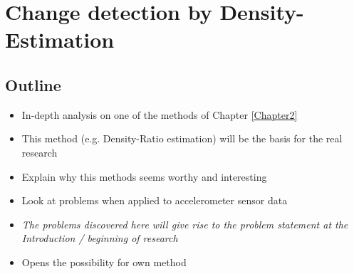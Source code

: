 
\chapter{Change detection by Density-Estimation}

\label{Chapter3} %


\section{Outline}
\begin{itemize}
  \item In-depth analysis on one of the methods of Chapter \ref{Chapter2}
  \item This method (e.g. Density-Ratio estimation) will be the basis for the real research
  \item Explain why this methods seems worthy and interesting
  \item Look at problems when applied to accelerometer sensor data
  \item \emph{The problems discovered here will give rise to the problem statement at the Introduction / beginning of research}
  \item Opens the possibility for own method
\end{itemize}